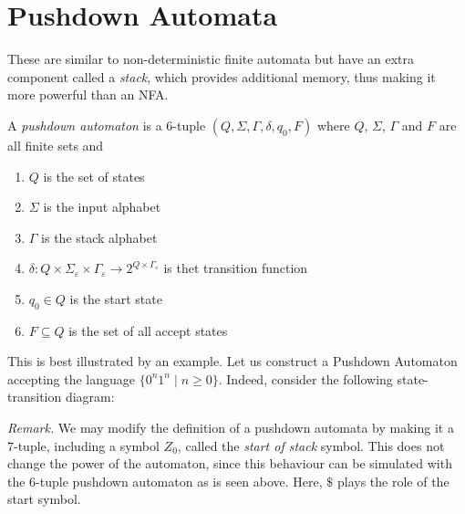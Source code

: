 \section{Pushdown Automata}
These are similar to non-deterministic finite automata but have an extra component called a \textit{stack}, which provides additional memory, thus making it more powerful than an NFA.

\begin{definition}
    A \textit{pushdown automaton} is a 6-tuple $(Q,\Sigma,\Gamma,\delta,q_0, F)$ where $Q$, $\Sigma$, $\Gamma$ and $F$ are all finite sets and 
    \begin{enumerate}
        \item $Q$ is the set of states 
        \item $\Sigma$ is the input alphabet 
        \item $\Gamma$ is the stack alphabet 
        \item $\delta:Q\times\Sigma_\varepsilon\times\Gamma_\varepsilon\to 2^{Q\times\Gamma_\varepsilon}$ is thet transition function
        \item $q_0\in Q$ is the start state 
        \item $F\subseteq Q$ is the set of all accept states
    \end{enumerate}
\end{definition}

This is best illustrated by an example. Let us construct a Pushdown Automaton accepting the language $\{0^n1^n\mid n\ge 0\}$. Indeed, consider the following state-transition diagram:
\begin{center}
\end{center}

\textit{Remark.} We may modify the definition of a pushdown automata by making it a 7-tuple, including a symbol $Z_0$, called the \textit{start of stack} symbol. This does not change the power of the automaton, since this behaviour can be simulated with the 6-tuple pushdown automaton as is seen above. Here, $\$$ plays the role of the start symbol.

